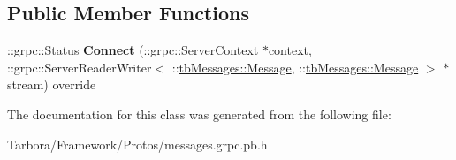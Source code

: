 \subsection*{Public Member Functions}
\begin{DoxyCompactItemize}
\item 
\mbox{\label{classtbMessages_1_1TarboraMessages_1_1WithGenericMethod__Connect_a525a75faca8878ed7ffb20a51cea9626}} 
\+::grpc\+::\+Status {\bfseries Connect} (\+::grpc\+::\+Server\+Context $\ast$context, \+::grpc\+::\+Server\+Reader\+Writer$<$ \+::\hyperlink{classtbMessages_1_1Message}{tb\+Messages\+::\+Message}, \+::\hyperlink{classtbMessages_1_1Message}{tb\+Messages\+::\+Message} $>$ $\ast$stream) override
\end{DoxyCompactItemize}


The documentation for this class was generated from the following file\+:\begin{DoxyCompactItemize}
\item 
Tarbora/\+Framework/\+Protos/messages.\+grpc.\+pb.\+h\end{DoxyCompactItemize}
